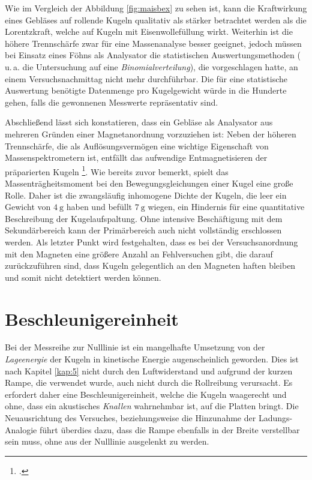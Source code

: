 Wie im Vergleich der Abbildung \ref{fig:maisbex} zu sehen ist, kann die Kraftwirkung eines Gebläses auf rollende Kugeln qualitativ als stärker betrachtet werden als die Lorentzkraft, welche auf Kugeln mit Eisenwollefüllung wirkt. Weiterhin ist die höhere Trennschärfe zwar für eine Massenanalyse besser geeignet, jedoch müssen bei Einsatz eines Föhns als Analysator die statistischen Auswertungsmethoden ( u.\,a. die Untersuchung auf eine \textit{Binomialverteilung}), die \textcite[S.\,48]{Mais2014} vorgeschlagen hatte, an einem Versuchsnachmittag nicht mehr durchführbar. Die für eine statistische Auswertung benötigte Datenmenge pro Kugelgewicht würde in die Hunderte gehen, falls die gewonnenen Messwerte repräsentativ sind.

Abschließend lässt sich konstatieren, dass ein Gebläse als Analysator aus mehreren Gründen einer Magnetanordnung vorzuziehen ist: Neben der höheren Trennschärfe, die als Auflösungsvermögen eine wichtige Eigenschaft von Massenspektrometern ist, entfällt das aufwendige Entmagnetisieren der präparierten Kugeln \footcite[vgl.][S.\,49]{Mais2014}. Wie bereits zuvor bemerkt, spielt das Massenträgheitsmoment bei den Bewegungsgleichungen einer Kugel eine große Rolle. Daher ist die zwangsläufig inhomogene Dichte der Kugeln, die leer ein Gewicht von $\SI{4}{\gram}$ haben und befüllt $\SI{7}{\gram}$ wiegen, ein Hindernis für eine quantitative Beschreibung der Kugelaufspaltung. Ohne intensive Beschäftigung mit dem Sekundärbereich kann der Primärbereich auch nicht vollständig erschlossen werden. Als letzter Punkt wird festgehalten, dass es bei der Versuchsanordnung mit den Magneten eine größere Anzahl an Fehlversuchen gibt, die darauf zurückzuführen sind, dass Kugeln gelegentlich an den Magneten haften bleiben und somit nicht detektiert werden können.

\section{Beschleunigereinheit}
\label{sec:rampe1}

Bei der Messreihe zur Nulllinie ist ein mangelhafte Umsetzung von der \textit{Lageenergie} der Kugeln in kinetische Energie augenscheinlich geworden. Dies ist nach Kapitel \ref{kap:5} nicht durch den Luftwiderstand und aufgrund der kurzen Rampe, die verwendet wurde, auch nicht durch die Rollreibung verursacht. Es erfordert daher eine Beschleunigereinheit, welche die Kugeln waagerecht und ohne, dass ein akustisches \textit{Knallen} wahrnehmbar ist, auf die Platten bringt. Die Neuausrichtung des Versuches, beziehungsweise die Hinzunahme der Ladungs-Analogie führt überdies dazu, dass die Rampe ebenfalls in der Breite verstellbar sein muss, ohne aus der Nulllinie ausgelenkt zu werden.

